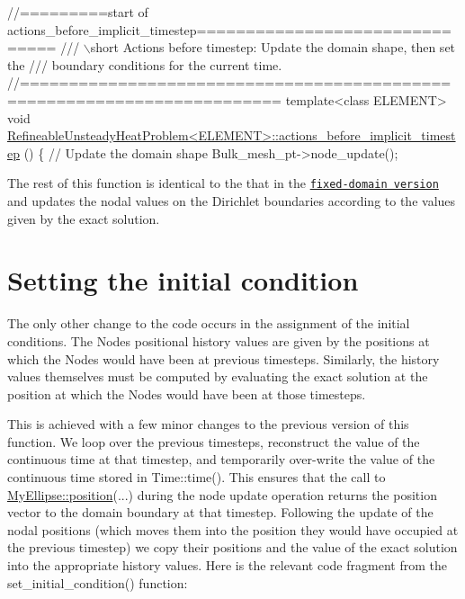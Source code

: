  
\begin{DoxyCodeInclude}
\textcolor{comment}{//=========start of actions\_before\_implicit\_timestep===============================}
\textcolor{comment}{/// \(\backslash\)short Actions before timestep: Update the domain shape, then set the }
\textcolor{comment}{}\textcolor{comment}{/// boundary conditions for the current time.}
\textcolor{comment}{}\textcolor{comment}{//========================================================================}
\textcolor{keyword}{template}<\textcolor{keyword}{class} ELEMENT>
\textcolor{keywordtype}{void} \hyperlink{classRefineableUnsteadyHeatProblem_ac754f1313cd6d684c149443beb5bcf9e}{RefineableUnsteadyHeatProblem<ELEMENT>::actions\_before\_implicit\_timestep}
      ()
\{
 \textcolor{comment}{// Update the domain shape}
 Bulk\_mesh\_pt->node\_update();

\end{DoxyCodeInclude}


The rest of this function is identical to the that in the \href{../../two_d_unsteady_heat/html/index.html}{\tt fixed-\/domain version} and updates the nodal values on the Dirichlet boundaries according to the values given by the exact solution.



 

\hypertarget{index_set_init}{}\section{Setting the initial condition}\label{index_set_init}
The only other change to the code occurs in the assignment of the initial conditions. The {\ttfamily Nodes\textquotesingle{}} positional history values are given by the positions at which the {\ttfamily Nodes} would have been at previous timesteps. Similarly, the history values themselves must be computed by evaluating the exact solution at the position at which the {\ttfamily Nodes} would have been at those timesteps.

This is achieved with a few minor changes to the previous version of this function. We loop over the previous timesteps, reconstruct the value of the continuous time at that timestep, and temporarily over-\/write the value of the continuous time stored in {\ttfamily Time\+::time()}. This ensures that the call to {\ttfamily \hyperlink{classMyEllipse_a7b139a2f4564005773c83325f2414e3e}{My\+Ellipse\+::position}}(...) during the node update operation returns the position vector to the domain boundary at that timestep. Following the update of the nodal positions (which moves them into the position they would have occupied at the previous timestep) we copy their positions and the value of the exact solution into the appropriate history values. Here is the relevant code fragment from the {\ttfamily set\+\_\+initial\+\_\+condition()} function\+:


